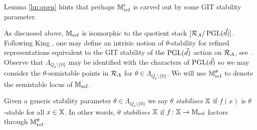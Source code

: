 \documentclass[12pt]{amsart}
\newcommand{\Wt}{\textup{Wt}}
\begin{document}
Lemma \ref{lm:open} hints that perhaps $\mathbb{M}'_{\textup{ref}}$ is carved out by some GIT stability parameter. 

As discussed above, $\mathbb{M}_{\text{ref}}$ is isomorphic to the quotient stack $[\mathcal{R}_A/ \operatorname{PGL}(\vec{d})]$.
Following King \cite{Ki}, one may define an intrisic notion of $\theta$-stability for refined representations equivalent to the GIT stability of the $\operatorname{PGL}(\vec{d})$ action on $\mathcal{R}_A$,  see \cite[Definition 3.4]{Abd}. 
Observe that $\Lambda_{{Q_0}\setminus \{0\}}$ may be identified with the characters of $\operatorname{PGL}(\vec{d})$ so we may consider the $\theta$-semistable points in $\mathcal{R}_A$ for $\theta \in \Lambda_{{Q_0}\setminus \{0\}}$.
We will use $\mathbb{M}_{\textup{ref}}^\theta$ to denote the semistable locus of $\mathbb{M}_{\textup{ref}}$.


\begin{definition}
Given a generic stability parameter $\theta \in \Lambda_{{Q_0}\setminus \{0\}}$ we say {\em $\theta$ stabilises $\mathbb{X}$} if $f(x)$ is $\theta$-stable for all $x \in \mathbb{X}$.
In other words, {\em $\theta$ stabilises $\mathbb{X}$} if $f \colon \mathbb{X} \rightarrow \mathbb{M}_{\textup{ref}}$ factors through $\mathbb{M}_{\textup{ref}}^\theta$.
\end{definition}
\end{document}

